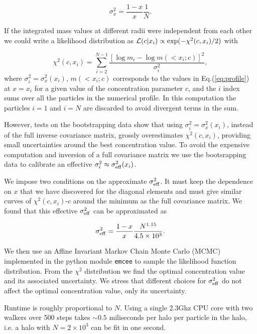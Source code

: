 \documentclass{emulateapj}
\begin{document}
\begin{equation}
\sigma_x^2 = \frac{1-x}{x}\frac{1}{N}.
\label{eq:sigma}
\end{equation}

If the integrated mass values at different radii were independent from
each other we could write a likelihood distribution as ${\cal
  L}(c|x_i)\propto \exp(-\chi^2(c,x_i)/2)$ with   

\begin{equation}
\chi^2(c,x_i)= \sum_{i=2}^{N-1}\frac{[\log m_i - \log m(< x_i;c)]^2}{\sigma_i^2},
\end{equation}
%
where $\sigma_i^2=\sigma_x^2(x_i)$, $m(<x_i;c)$ corresponds to the
values in Eq.(\ref{eq:profile}) at $x=x_i$ for a given value of the
concentration parameter $c$, and the $i$ index sums over all the
particles in the numerical profile. 
In this computation the particles $i=1$ and $i=N$ are discarded to
avoid divergent terms in the sum.

However, tests on the bootstrapping data show that using
$\sigma_i^2=\sigma_x^2(x_i)$, instead of the full inverse covariance
matrix, grossly overestimates $\chi^2(c,x_i)$,
providing small uncertainties around the best concentration value. 
To avoid the expensive computation and inversion of a full covariance
matrix we use the bootsrapping data to calibrate an effective
$\sigma_i^2\approx \sigma_{\rm eff}^2(x_i)$.

We impose two conditions on the approximate $\sigma_{\rm eff}^{2}$. It
must keep the dependence on $x$ that we have discovered for the
diagonal elements and must give similar curves of $\chi^{2}(c,x_i)$-$c$
around the minimum as the full covariance matrix.
We found that this effective $\sigma_{\rm eff}^2$ can be approximated
as 

\begin{equation}
\sigma_{\rm eff}^2 = \frac{1-x}{x}\frac{N^{1.15}}{4.5\times 10^3}.
\end{equation}

We then use an Affine Invariant Markov Chain Monte Carlo (MCMC)
implemented in the python module {\texttt{emcee}} \citep{emcee} to sample the
likelihood function distribution.
From the $\chi^2$ distribution we find the optimal concentration value
and its associated uncertainty.   
We stress that different choices for $\sigma^2_{\rm eff}$ do not
affect the optimal concentration value, only its uncertainty.

Runtime is roughly proportional to $N$. Using a single 2.3Ghz CPU core with two
walkers over 500 steps takes $\sim 0.5$ miliseconds per halo per
particle in the halo, i.e. a halo with $N=2\times 10^{3}$ can be fit
in one second. 
\end{document}
